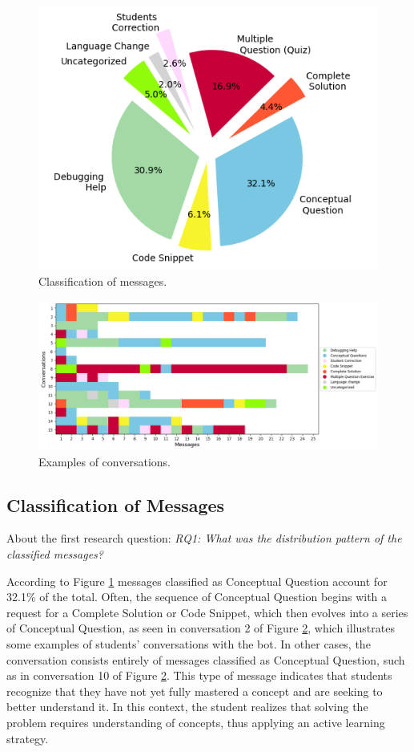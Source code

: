 \documentclass[a4paper,twoside]{article}
\begin{document}
\begin{figure}[h!]
    \centering
    \includegraphics[scale=0.62]{img/figure1.png}
    \caption{Classification of messages.}
    \label{fig:graph1}
\end{figure}

\begin{figure}[htbp]
  \centering
  \includegraphics[scale=0.52]{img/figure2.png}
  \caption{Examples of conversations.}
  \label{fig:graph2}
\end{figure}

\subsection{Classification of Messages}

About the first research question: \textit{RQ1: What was the distribution
pattern of the classified messages?}

According to Figure \ref{fig:graph1} messages classified as
Conceptual Question account for 32.1\% of the total. Often, the sequence of
Conceptual Question begins with a request for a Complete Solution or Code
Snippet, which then evolves into a series of Conceptual Question, as seen in
conversation 2 of Figure \ref{fig:graph2}, which illustrates some examples of
students' conversations with the bot. In other cases, the conversation
consists entirely of messages classified as Conceptual Question, such as in
conversation 10 of Figure \ref{fig:graph2}. This type of message indicates that
students recognize that they have not yet fully mastered a concept and are
seeking to better understand it. In this context, the student realizes that
solving the problem requires understanding of concepts, thus applying an active
learning strategy.
\end{document}
